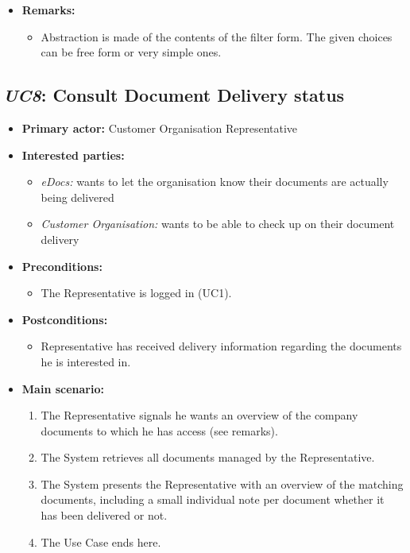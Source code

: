 \documentclass[a4paper,10pt]{article}
\begin{document}
\begin{itemize}
    \item \textbf{Remarks:}
        \begin{itemize}
            \item Abstraction is made of the contents of the filter form. The given choices can be free form or very simple ones.
        \end{itemize}
\end{itemize}

\subsection{\emph{UC8}: Consult Document Delivery status}
\begin{itemize}
    \item \textbf{Primary actor:} Customer Organisation Representative
    \item \textbf{Interested parties:} 
        \begin{itemize}
            \item \textit{eDocs:} wants to let the organisation know their documents are actually being delivered
            \item \textit{Customer Organisation:} wants to be able to check up on their document delivery
        \end{itemize}

    \item \textbf{Preconditions:}
        \begin{itemize}
            \item The Representative is logged in (UC1).
        \end{itemize}

    \item \textbf{Postconditions:}
        \begin{itemize}
            \item Representative has received delivery information regarding the documents he is interested in.
        \end{itemize}
        
    \item \textbf{Main scenario:} 
    \begin{enumerate}
       \item The Representative signals he wants an overview of the company documents to which he has access (see remarks).
       \item The System retrieves all documents managed by the Representative.
       \item The System presents the Representative with an overview of the matching documents, including a small individual note per document whether it has been delivered or not.
       \item The Use Case ends here.
    \end{enumerate}


\end{itemize}
\end{document}
